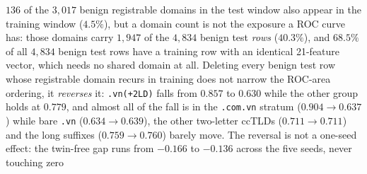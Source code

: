 $136$ of the $3{,}017$ benign registrable domains in the test window also appear in the training window ($4.5\%$), but a domain count is not the exposure a ROC curve has: those domains carry $1{,}947$ of the $4{,}834$ benign test \emph{rows} ($40.3\%$), and $68.5\%$ of all $4{,}834$ benign test rows have a training row with an identical 21-feature vector, which needs no shared domain at all. Deleting every benign test row whose registrable domain recurs in training does not narrow the ROC-area ordering, it \emph{reverses} it: \texttt{.vn(+2LD)} falls from $0.857$ to $0.630$ while the other group holds at $0.779$, and almost all of the fall is in the \texttt{.com.vn} stratum ($0.904 \to 0.637$) while bare \texttt{.vn} ($0.634 \to 0.639$), the other two-letter ccTLDs ($0.711 \to 0.711$) and the long suffixes ($0.759 \to 0.760$) barely move. The reversal is not a one-seed effect: the twin-free gap runs from $-0.166$ to $-0.136$ across the five seeds, never touching zero%
